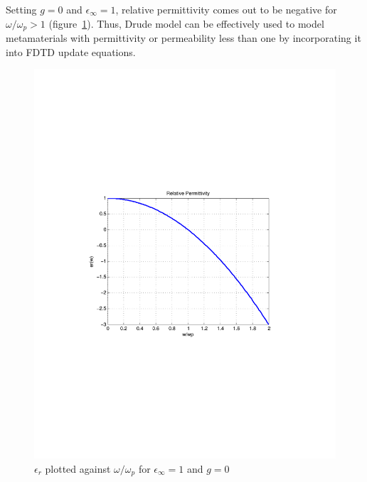 Setting $g=0$ and $\epsilon_\infty=1$, relative permittivity comes out to be negative for $\omega/\omega_p > 1$ (figure~\ref{DrudeModel_er}). Thus, Drude model can be effectively used to model metamaterials with permittivity or permeability less than one by incorporating it into FDTD update equations.
\begin{figure}[H]
\centering
\includegraphics[scale=0.8, trim=4cm 8.5cm 4cm 8.5cm, clip]{FigCh03_DrudeModel_er.pdf}
\caption{$\epsilon_r$ plotted against $\omega/\omega_p$ for $\epsilon_\infty=1$ and $g=0$}
\label{DrudeModel_er}
\end{figure}
